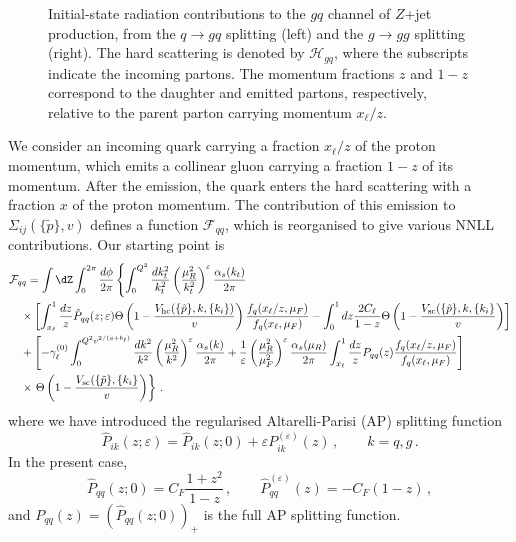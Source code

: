 \begin{figure}[H]
\caption{Initial-state radiation contributions to the $gq$ channel of
$Z$+jet production, from the $q \to gq$ splitting (left) and the $g \to
gg$ splitting (right). The hard scattering is denoted by
$\mathcal{H}_{gq}$, where the subscripts indicate the incoming
partons. The momentum fractions $z$ and $1-z$ correspond to the
daughter and emitted partons, respectively, relative to the parent
parton carrying momentum $x_\ell/z$.}
\label{fig:g-incoming}
\end{figure}

We consider an incoming quark carrying a fraction $x_{\ell}/z$ of the proton momentum, which emits a collinear gluon carrying a fraction $1-z$ of its momentum. After the emission, the quark enters the hard scattering
with a fraction $x$ of the proton momentum. The contribution of this emission to $\Sigma_{ij}(\{\tilde p\},v)$ defines a function $\mathcal{F}_{qq}$, which is reorganised to give various NNLL contributions. Our starting point is
\begin{equation}
  \label{eq:FISR-start}
  \begin{aligned}
    &\mathcal{F}_{qq} = \int \dZ \int_0^{2\pi}\frac{d\phi}{2\pi}\left\{\int_0^{Q^2}\frac{dk_t^2}{k_t^2}\left(\frac{\mu_R^2}{k_t^2}\right)^{\varepsilon} \frac{\alpha_s(k_t)}{2\pi}\right. \\
    & \quad \times \left[\int_{x_\ell}^1 \frac{dz}{z}\hat P_{qq}(z;\varepsilon)\Theta\left(1-\frac{V_{\mathrm{hc}}(\{\tilde{p}\},k,\{k_i\})}{v}\right) \frac{f_q(x_\ell/z,\mu_F)}{f_q(x_\ell,\mu_F)}- \int_0^1 dz \frac{2C_\ell}{1-z}\Theta\left(1-\frac{V_{\mathrm{sc}}(\{\tilde{p}\},k,\{k_i\}}{v}\right)\right] \\
   & \quad +\left[-\gamma_\ell^{(0)}\int_0^{Q^2v^{2/(a+b_\ell)}}\frac{dk^2}{k^2}\left(\frac{\mu_R^2}{k^2}\right)^{\varepsilon}\frac{\alpha_s(k)}{2\pi}
     +\frac{1}{\varepsilon} \left(\frac{\mu_R^2}{\mu_F^2}\right)^{\varepsilon} \frac{\alpha_s(\mu_R)}{2\pi} \int_{x_\ell}^1 \frac{dz}{z} P_{qq}(z) \frac{f_q(x_\ell/z,\mu_F)}{f_q(x_\ell,\mu_F)}\right]  \\ 
     & \quad \times \left. \Theta\left(1-\frac{V_{\mathrm{sc}}(\{\tilde{p}\},\{k_i\}}{v}\right)\right\} \,.
\end{aligned}
\end{equation}
where we have introduced the regularised Altarelli-Parisi (AP) splitting function
\begin{equation}
  \label{eq:regularised-Pij}
  \hat P_{ik}(z;\varepsilon) = \hat P_{ik}(z;0)+\varepsilon P^{(\varepsilon)}_{ik}(z)\,, \qquad k=q,g\,. 
\end{equation}
In the present case,
\begin{equation}
  \label{eq:Pqq}
  \hat P_{qq}(z;0)  = C_F \frac{1+z^2}{1-z}\,, \qquad \hat P_{qq}^{(\varepsilon)}(z)=-C_F (1-z)\,,
\end{equation}
and $P_{qq}(z) = (\hat{P}_{qq}(z;0))_+$ is the full AP splitting function.


